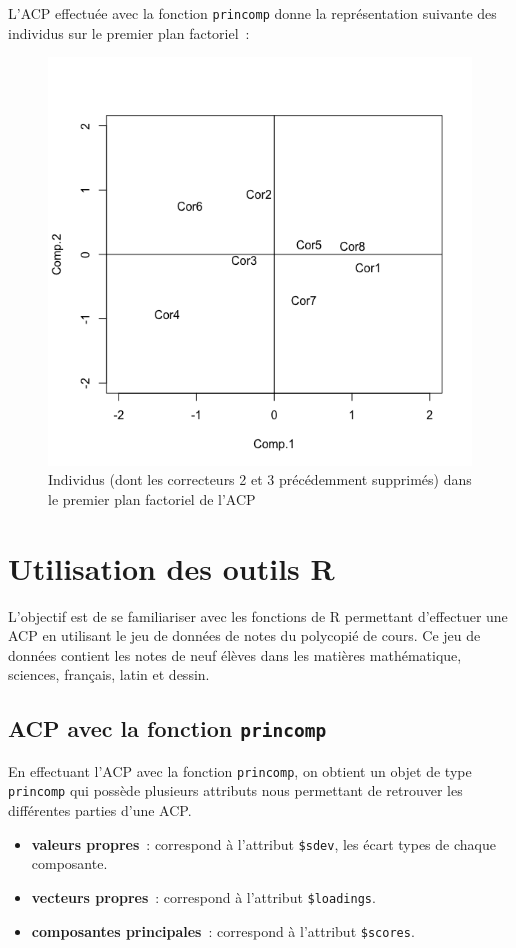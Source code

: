 \documentclass[a4paper,11pt]{report}
\begin{document}
L'ACP effectuée avec la fonction \texttt{princomp} donne la représentation suivante des individus sur le premier plan factoriel~:

\begin{figure}[H]
	\centering
	\captionsetup{justification=centering, margin=2cm}
	\includegraphics[width=.5\linewidth]{img/2-1-5-individus-with-na-premier-plan-factoriel}
	\caption{\scriptsize Individus (dont les correcteurs 2 et 3 précédemment supprimés) dans le premier plan factoriel de l'ACP}
	\label{fig:individus_with_na_premier_plan_factoriel}
\end{figure}


\section{Utilisation des outils R}

L'objectif est de se familiariser avec les fonctions de R permettant d'effectuer une ACP en utilisant le jeu de données de notes du polycopié de cours. Ce jeu de données contient les notes de neuf élèves dans les matières mathématique, sciences, français, latin et dessin.


\subsection{ACP avec la fonction \texttt{princomp}}

En effectuant l'ACP avec la fonction \texttt{princomp}, on obtient un objet de type \texttt{princomp} qui possède plusieurs attributs nous permettant de retrouver les différentes parties d'une ACP.

\begin{itemize}
	\item \textbf{valeurs propres}~: correspond à l'attribut \texttt{\$sdev}, les écart types de chaque composante.
	\item \textbf{vecteurs propres}~: correspond à l'attribut \texttt{\$loadings}.
	\item \textbf{composantes principales}~: correspond à l'attribut \texttt{\$scores}.
\end{itemize}
\end{document}
